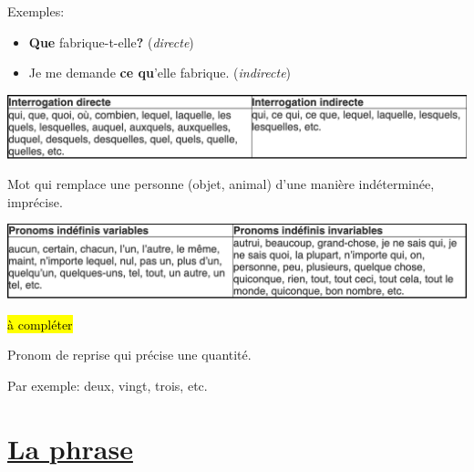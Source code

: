 \documentclass[10pt, french]{article}
\begin{document}
\begin{multicols*}{2}
\begin{definitionNOHFILLsub}
Exemples:
\begin{itemize}
	\item	\textbf{Que} fabrique-t-elle\textbf{?} (\textit{directe})
	\item	Je me demande \textbf{ce qu}'elle fabrique. (\textit{indirecte})
\end{itemize}
\begin{center}
	\includegraphics[width=0.9\columnwidth]{pronom-interg}
\end{center}
\end{definitionNOHFILLsub}

\begin{definitionNOHFILLsub}
Mot qui remplace une personne (objet, animal) d'une manière indéterminée, imprécise.

\tcbline

\begin{center}
	\includegraphics[width=0.9\columnwidth]{pronom-indef}
\end{center}
\hl{à compléter}
\end{definitionNOHFILLsub}

\begin{definitionNOHFILLsub}
Pronom de reprise qui précise une quantité.

\tcbline

Par exemple: deux, vingt, trois, etc.
\end{definitionNOHFILLsub}


\newpage
\section*{\href{http://www.alloprof.qc.ca/bv/pages/f1128.aspx}{La phrase}}


\end{multicols*}
\end{document}
